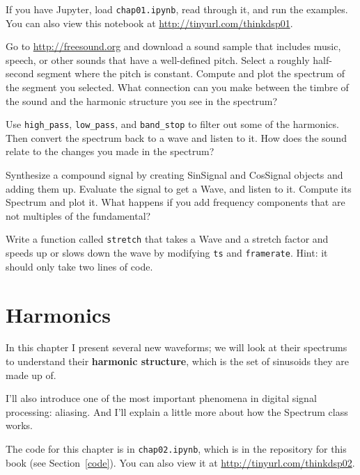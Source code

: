\documentclass[12pt]{book}
\begin{document}
\begin{exercise}
If you have Jupyter, load {\tt chap01.ipynb}, read through it, and run
the examples.  You can also view this notebook at
\url{http://tinyurl.com/thinkdsp01}.
\end{exercise}


\begin{exercise}
Go to \url{http://freesound.org} and download a sound sample that
includes music, speech, or other sounds that have a well-defined pitch.
Select a roughly half-second segment where the pitch is
constant.  Compute and plot the spectrum of the segment you selected.
What connection can you make between the timbre of the sound and the
harmonic structure you see in the spectrum?

Use \verb"high_pass", \verb"low_pass", and \verb"band_stop" to
filter out some of the harmonics.  Then convert the spectrum back
to a wave and listen to it.  How does the sound relate to the
changes you made in the spectrum?
\end{exercise}


\begin{exercise}
Synthesize a compound signal by creating SinSignal and CosSignal
objects and adding them up.  Evaluate the signal to get a Wave,
and listen to it.  Compute its Spectrum and plot it.
What happens if you add frequency
components that are not multiples of the fundamental?
\end{exercise}


\begin{exercise}
Write a function called {\tt stretch} that takes a Wave and a stretch
factor and speeds up or slows down the wave by modifying {\tt ts} and
{\tt framerate}.  Hint: it should only take two lines of code.
\end{exercise}


\chapter{Harmonics}
\label{harmonics}

In this chapter I present several new waveforms; we will look at
their spectrums to understand their {\bf harmonic structure}, which is
the set of sinusoids they are made up of.

I'll also introduce one of the most important phenomena in digital
signal processing: aliasing.  And I'll explain a little more about how
the Spectrum class works.

The code for this chapter is in {\tt chap02.ipynb}, which is in the
repository for this book (see Section~\ref{code}).
You can also view it at \url{http://tinyurl.com/thinkdsp02}.
\end{document}
